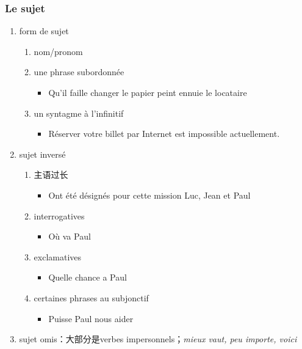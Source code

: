 \documentclass[UTF8]{report}
\begin{document}
\subsubsection{Le sujet}
\begin{enumerate}
    \item form de sujet
    \begin{enumerate}
        \item nom/pronom
        \item une phrase subordonnée
        \begin{itemize}
            \item Qu’il faille changer le papier peint ennuie le locataire
        \end{itemize}
        \item un syntagme à l’infinitif
        \begin{itemize}
            \item Réserver votre billet par Internet est impossible actuellement.
        \end{itemize}
    \end{enumerate}
    \item sujet inversé
    \begin{enumerate}
        \item 主语过长
        \begin{itemize}
            \item Ont été désignés pour cette mission Luc, Jean et Paul
        \end{itemize}
        \item interrogatives
        \begin{itemize}
            \item Où va Paul
        \end{itemize}
        \item exclamatives
        \begin{itemize}
            \item Quelle chance a Paul
        \end{itemize}
        \item certaines phrases au subjonctif
        \begin{itemize}
            \item Puisse Paul nous aider
        \end{itemize}
    \end{enumerate}
    \item sujet omis：大部分是verbes impersonnels；\textit{mieux vaut, peu importe, voici}
    \begin{itemize}

\end{itemize}
\end{enumerate}
\end{document}
